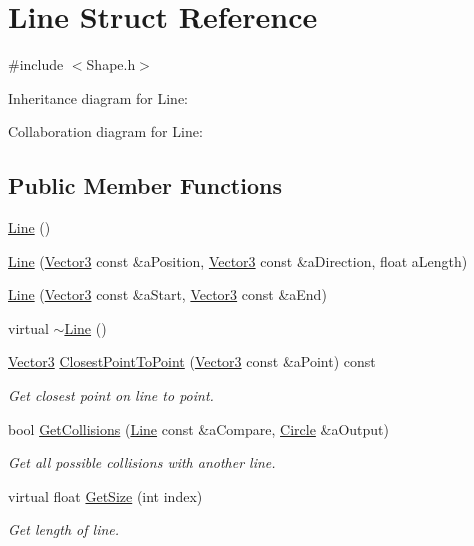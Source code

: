 \hypertarget{structLine}{}\section{Line Struct Reference}
\label{structLine}


{\ttfamily \#include $<$Shape.\+h$>$}



Inheritance diagram for Line\+:


Collaboration diagram for Line\+:
\subsection*{Public Member Functions}
\begin{DoxyCompactItemize}
\item 
\hyperlink{structLine_acc11b8a429d8cdd63ba6803dff5602b3}{Line} ()
\item 
\hyperlink{structLine_a1aa4afb079929d362dc13c811b82c7c6}{Line} (\hyperlink{structVector3}{Vector3} const \&a\+Position, \hyperlink{structVector3}{Vector3} const \&a\+Direction, float a\+Length)
\item 
\hyperlink{structLine_a0b2f354dc2848f04096982d812ff7c64}{Line} (\hyperlink{structVector3}{Vector3} const \&a\+Start, \hyperlink{structVector3}{Vector3} const \&a\+End)
\item 
virtual \hyperlink{structLine_aabe85f48d22d92b62257091f48174fac}{$\sim$\+Line} ()
\item 
\hyperlink{structVector3}{Vector3} \hyperlink{structLine_aa7c29c7cef9f328553f174458d37a39a}{Closest\+Point\+To\+Point} (\hyperlink{structVector3}{Vector3} const \&a\+Point) const 
\begin{DoxyCompactList}\small\item\em Get closest point on line to point. \end{DoxyCompactList}\item 
bool \hyperlink{structLine_a24923692cdeab26f3907f392a1c57b22}{Get\+Collisions} (\hyperlink{structLine}{Line} const \&a\+Compare, \hyperlink{structCircle}{Circle} \&a\+Output)
\begin{DoxyCompactList}\small\item\em Get all possible collisions with another line. \end{DoxyCompactList}\item 
virtual float \hyperlink{structLine_a16918493d6a5eaa3576ebb0c1f386197}{Get\+Size} (int index)
\begin{DoxyCompactList}\small\item\em Get length of line. \end{DoxyCompactList}\end{DoxyCompactItemize}
